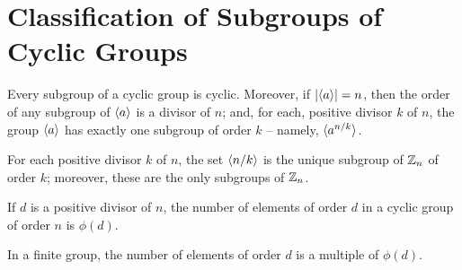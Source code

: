 \section{Classification of Subgroups of Cyclic Groups}

\begin{theorem}
	Every subgroup of a cyclic group is cyclic. Moreover, if $\left\lvert \langle a \rangle \right\rvert = n$, then the order of any subgroup of $\langle a \rangle$ is a divisor of $n$; and, for each, positive divisor $k$ of $n$, the group $\langle a \rangle$ has exactly one subgroup of order $k$ -- namely, $\langle a^{n/k} \rangle$.
\end{theorem}

\begin{corollary}
	For each positive divisor $k$ of $n$, the set $\langle n/k \rangle$ is the unique subgroup of $\mathbb{Z}_n$ of order $k$; moreover, these are the only subgroups of $\mathbb{Z}_n$.
\end{corollary}

\begin{theorem}
	If $d$ is a positive divisor of $n$, the number of elements of order $d$ in a cyclic group of order $n$ is $\phi(d)$.
\end{theorem}

\begin{corollary}
	In a finite group, the number of elements of order $d$ is a multiple of $\phi(d)$.
\end{corollary}
